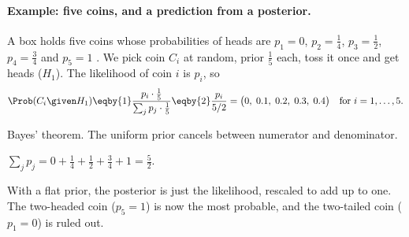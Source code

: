 \paragraph{Example: five coins, and a prediction from a posterior.}
A box holds five coins whose probabilities of heads are $p_1=0$, $p_2=\tfrac14$,
$p_3=\tfrac12$, $p_4=\tfrac34$ and $p_5=1$ . We pick coin $C_i$ at
random, prior $\tfrac15$ each, toss it once and get heads ($H_1$). The likelihood of
coin $i$ is $p_i$, so
\begin{align*}
\Prob(C_i\given H_1)
\eqby{1}\frac{p_i\cdot\tfrac15}{\sum_jp_j\cdot\tfrac15}
\eqby{2}\frac{p_i}{5/2}
=\bigl(0,\;0.1,\;0.2,\;0.3,\;0.4\bigr)\quad\text{for } i=1,\dots,5 .
\end{align*}
\begin{explain}
  \item Bayes' theorem. The uniform prior cancels between numerator and
        denominator.
  \item $\sum_jp_j=0+\tfrac14+\tfrac12+\tfrac34+1=\tfrac52$.
\end{explain}
With a flat prior, the posterior is just the likelihood, rescaled to add up to
one. The two-headed coin ($p_5=1$) is now the most probable, and the two-tailed
coin ($p_1=0$) is ruled out.

